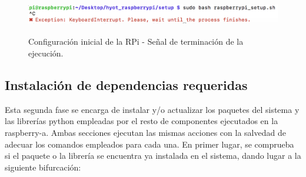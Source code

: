 \documentclass[12pt,a4paper, twoside]{report}
\begin{document}
	 		\begin{figure}[!ht]   
				\caption{Configuración inicial de la RPi - Señal de terminación de la ejecución.} 
				\begin{center} 
					\includegraphics[width=15cm,height=1cm]{Images/userGuide/setup/exitSignal} \\
					\label{fig:userguide_setup_exitSignal} 
				\end{center}  
			\end{figure}
	 
	\subsection{Instalación de dependencias requeridas}
	 
	Esta segunda fase se encarga de instalar y/o actualizar los paquetes del sistema y las librerías \gls{python} empleadas por el resto de componentes ejecutados en la \gls{raspberry-a}. Ambas secciones ejecutan las mismas acciones con la salvedad de adecuar los comandos empleados para cada una. En primer lugar, se comprueba si el paquete o la librería se encuentra ya instalada en el sistema, dando lugar a la siguiente bifurcación:
	
\end{document}
